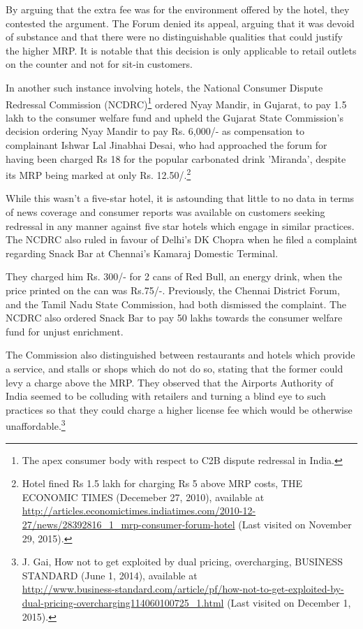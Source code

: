 \begin{multicols}{2}
\noi
By arguing that the extra fee was for the environment offered by the hotel, they contested the
argument. The Forum denied its appeal, arguing that it was devoid of substance and that there
were no distinguishable qualities that could justify the higher MRP. It is notable that this
decision is only applicable to retail outlets on the counter and not for sit-in customers.

\noi
In another such instance involving hotels, the National Consumer Dispute Redressal
Commission (NCDRC)\footnote{The apex consumer body with respect to C2B dispute redressal in India.} ordered Nyay Mandir, in Gujarat, to pay 1.5 lakh to the consumer
welfare fund and upheld the Gujarat State Commission's decision ordering Nyay Mandir to pay
Rs. 6,000/- as compensation to complainant Ishwar Lal Jinabhai Desai, who had approached the forum for having been charged Rs 18 for the popular carbonated drink 'Miranda', despite
its MRP being marked at only Rs. 12.50/.\footnote{Hotel fined Rs 1.5 lakh for charging Rs 5 above MRP costs, THE ECONOMIC TIMES (Decemeber 27, 2010), available at\\ \url{http://articles.economictimes.indiatimes.com/2010-12-27/news/28392816_1_mrp-consumer-forum-hotel} (Last visited on November 29, 2015).}

\noi
While this wasn’t a five-star hotel, it is astounding that little to no data in terms of news
coverage and consumer reports was available on customers seeking redressal in any manner
against five star hotels which engage in similar practices. The NCDRC also ruled in favour of
Delhi’s DK Chopra when he filed a complaint regarding Snack Bar at Chennai’s Kamaraj
Domestic Terminal.

\noi
They charged him Rs. 300/- for 2 cans of Red Bull, an energy drink, when the price printed on
the can was Rs.75/-. Previously, the Chennai District Forum, and the Tamil Nadu State
Commission, had both dismissed the complaint. The NCDRC also ordered Snack Bar to pay
50 lakhs towards the consumer welfare fund for unjust enrichment.

\noi
The Commission also distinguished between restaurants and hotels which provide a service,
and stalls or shops which do not do so, stating that the former could levy a charge above the
MRP. They observed that the Airports Authority of India seemed to be colluding with retailers
and turning a blind eye to such practices so that they could charge a higher license fee which
would be otherwise unaffordable.\footnote{J. Gai, How not to get exploited by dual pricing, overcharging, BUSINESS STANDARD (June 1, 2014), available at\\ \url{http://www.business-standard.com/article/pf/how-not-to-get-exploited-by-dual-pricing-overcharging114060100725_1.html} (Last visited on December 1, 2015).}


\end{multicols}
